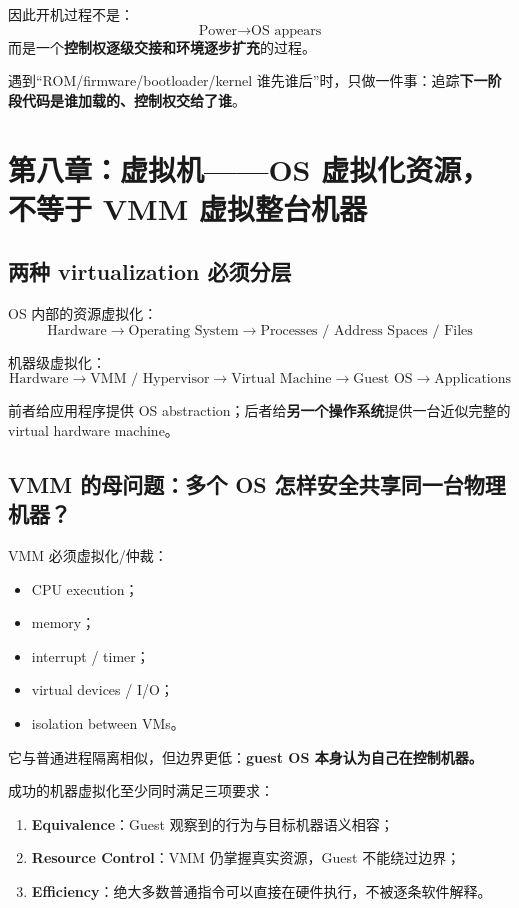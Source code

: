 \documentclass[11pt,a4paper]{ctexart}
\newcommand{\kw}[1]{\textbf{#1}}
\begin{document}
因此开机过程不是：
\[
\text{Power}\rightarrow\text{OS appears}
\]
而是一个\kw{控制权逐级交接和环境逐步扩充}的过程。

\begin{exam}[引导题信号]
遇到“ROM/firmware/bootloader/kernel 谁先谁后”时，只做一件事：追踪\kw{下一阶段代码是谁加载的、控制权交给了谁}。
\end{exam}

\section{第八章：虚拟机——OS 虚拟化资源，不等于 VMM 虚拟整台机器}

\subsection{两种 virtualization 必须分层}

OS 内部的资源虚拟化：
\[
\boxed{
\text{Hardware}
\rightarrow
\text{Operating System}
\rightarrow
\text{Processes / Address Spaces / Files}
}
\]

机器级虚拟化：
\[
\boxed{
\text{Hardware}
\rightarrow
\text{VMM / Hypervisor}
\rightarrow
\text{Virtual Machine}
\rightarrow
\text{Guest OS}
\rightarrow
\text{Applications}
}
\]

前者给应用程序提供 OS abstraction；后者给\kw{另一个操作系统}提供一台近似完整的 virtual hardware machine。

\subsection{VMM 的母问题：多个 OS 怎样安全共享同一台物理机器？}

VMM 必须虚拟化/仲裁：
\begin{itemize}
  \item CPU execution；
  \item memory；
  \item interrupt / timer；
  \item virtual devices / I/O；
  \item isolation between VMs。
\end{itemize}

它与普通进程隔离相似，但边界更低：\kw{guest OS 本身认为自己在控制机器。}

成功的机器虚拟化至少同时满足三项要求：
\begin{enumerate}
  \item \kw{Equivalence}：Guest 观察到的行为与目标机器语义相容；
  \item \kw{Resource Control}：VMM 仍掌握真实资源，Guest 不能绕过边界；
  \item \kw{Efficiency}：绝大多数普通指令可以直接在硬件执行，不被逐条软件解释。
\end{enumerate}
\end{document}
